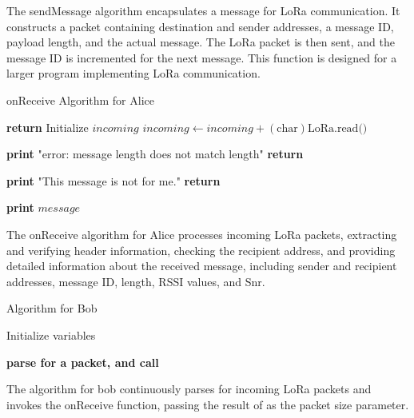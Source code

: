 The sendMessage algorithm encapsulates a message for LoRa communication. It constructs a packet containing destination and sender addresses, a message ID, payload length, and the actual message. The LoRa packet is then sent, and the message ID is incremented for the next message. This function is designed for a larger program implementing LoRa communication.
  \begin{algorithm}[hbt!]
    \caption{onReceive Algorithm for Alice}\label{alg:onReceive}
    \begin{algorithmic}
                \State \textbf{return}
            \EndIf
            \State {}
            \State Initialize $incoming$ 
                \State $incoming \gets incoming + (\text{char})\text{LoRa.read()}$
            \EndWhile
            
                \State \textbf{print} "error: message length does not match length"
                \State \textbf{return}
            \EndIf
            
                \State \textbf{print} "This message is not for me."
                \State \textbf{return}
            \EndIf
            
            \State {}
            \State \textbf{print} $message$
        \EndFunction
    \end{algorithmic}
\end{algorithm}
The onReceive algorithm for Alice processes incoming LoRa packets, extracting and verifying header information, checking the recipient address, and providing detailed information about the received message, including sender and recipient addresses, message ID, length, RSSI values, and Snr.
\begin{algorithm}[hbt!]
  \caption{Algorithm for Bob}\label{alg:Bob}
  \begin{algorithmic}
  \State Initialize variables
      
          \State \textbf{parse for a packet, and call} 
      \EndFunction
  \end{algorithmic}
\end{algorithm}
The algorithm for bob continuously parses for incoming LoRa packets and invokes the onReceive function, passing the result of as the packet size parameter.
